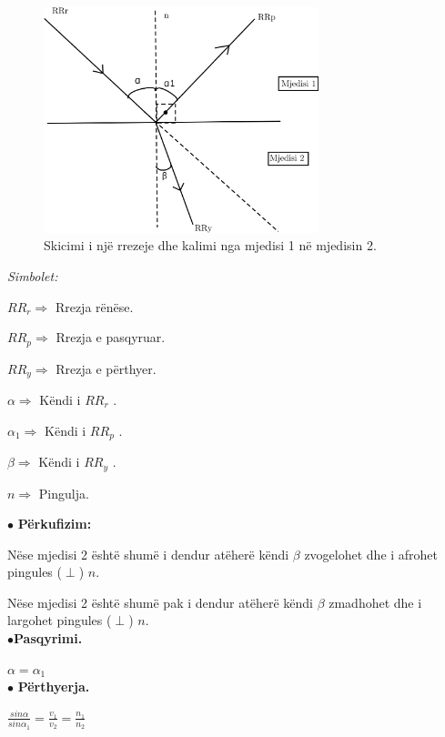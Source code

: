 \documentclass[twocolumn]{article}
\begin{document}
	\begin{figure}[h]
	\includegraphics[width=80mm]{Imazhet/Pasqyrimi.png}
	\caption{Skicimi i një rrezeje dhe kalimi nga mjedisi 1 në mjedisin 2.}
	\label{fig:boat1}
\end{figure}

\begin{center}
	\textit{Simbolet:}\\
\end{center}

$RR_r \Rightarrow$ Rrezja rënëse.

$RR_p \Rightarrow $ Rrezja e pasqyruar.

$RR_y \Rightarrow $ Rrezja e përthyer.

$\alpha \Rightarrow$ Këndi i $RR_r$ .

$\alpha_1 \Rightarrow$ Këndi i $RR_p$ .

$\beta  \Rightarrow$ Këndi i $RR_y$ .

$n \Rightarrow$ Pingulja.\\

\begin{center}
	$\bullet$  \textbf{Përkufizim:}
\end{center}

Nëse mjedisi 2 është shumë i dendur atëherë këndi $\beta$ zvogelohet dhe i afrohet pingules ($\perp$) $n$.

Nëse mjedisi 2 është shumë pak i dendur atëherë këndi $\beta$ zmadhohet dhe i largohet  pingules ($\perp$) $n$.\\


$\bullet$\textbf{Pasqyrimi.}

$\alpha=\alpha_1$\\

$\bullet$ \textbf{Përthyerja.}

$\frac{sin \alpha}{sin \alpha_1}=\frac{v_1}{v_2}=\frac{n_1}{n_2}$
\end{document}
